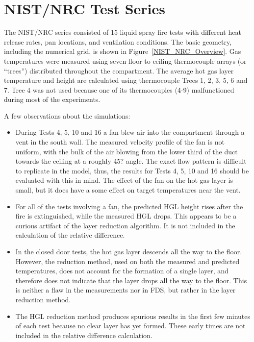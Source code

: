 \clearpage

\section{NIST/NRC Test Series}

The NIST/NRC series consisted of 15 liquid spray fire tests with different heat release rates, pan locations, and ventilation conditions. The basic
geometry, including the numerical grid, is shown in Figure~\ref{NIST_NRC_Overview}. Gas temperatures were measured using seven floor-to-ceiling
thermocouple arrays (or ``trees'') distributed throughout the compartment.  The average hot gas layer temperature and height are calculated using
thermocouple Trees 1, 2, 3, 5, 6 and 7. Tree 4 was not used because one of its thermocouples (4-9) malfunctioned during most of the experiments.

A few observations about the simulations:
\begin{itemize}
\item During Tests 4, 5, 10 and 16 a fan blew air into the compartment through a vent in the south wall.
The measured velocity profile of the fan is not uniform, with the bulk of the air blowing from the lower third of the duct towards the ceiling at a
roughly 45? angle.  The exact flow pattern is difficult to replicate in the model, thus, the results for Tests 4, 5, 10 and 16 should be evaluated
with this in mind. The effect of the fan on the hot gas layer is small, but it does have a some effect on target temperatures near the vent.
\item For all of the tests involving a fan, the predicted HGL height rises after the fire is extinguished,
while the measured HGL drops.  This appears to be a curious artifact of the layer reduction algorithm. It is not included in the calculation of the
relative difference.
\item In the closed door tests, the hot gas layer descends all the way to the floor.
However, the reduction method, used on both the measured and predicted temperatures, does not account for the formation of a single layer, and
therefore does not indicate that the layer drops all the way to the floor. This is neither a flaw in the measurements nor in FDS, but rather in the
layer reduction method.
\item The HGL reduction method produces spurious results in the first few minutes of each test because no clear layer has yet formed.
These early times are not included in the relative difference calculation.
\end{itemize}

